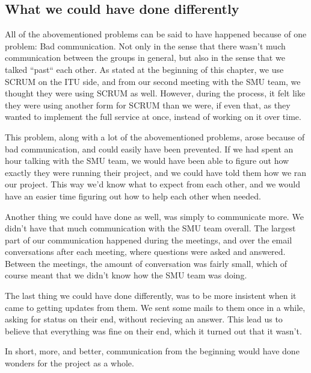 \subsection{What we could have done differently}
\label{Collaboration_SMU_CouldHave}
All of the abovementioned problems can be said to have happened because of one problem: Bad communication. Not only in the sense that there wasn't much communication between the groups in general, but also in the sense that we talked ``past`` each other. As stated at the beginning of this chapter, we use SCRUM on the ITU side, and from our second meeting with the SMU team, we thought  they were using SCRUM as well. However, during the process, it felt like they were using another form for SCRUM than we were, if even that, as they wanted to implement the full service at once, instead of working on it over time. 

This problem, along with a lot of the abovementioned problems, arose because of bad communication, and could easily have been prevented. If we had spent an hour talking with the SMU team, we would have been able to figure out how exactly they were running their project, and we could have told them how we ran our project. This way we'd know what to expect from each other, and we would have an easier time figuring out how to help each other when needed.

Another thing we could have done as well, was simply to communicate more. We didn't have that much communication with the SMU team overall. The largest part of our communication happened during the meetings, and over the email conversations after each meeting, where questions were asked and answered. Between the meetings, the amount of conversation was fairly small, which of course meant that we didn't know how the SMU team was doing.

The last thing we could have done differently, was to be more insistent when it came to getting updates from them. We sent some mails to them once in a while, asking for status on their end, without recieving an answer. This lead us to believe that everything was fine on their end, which it turned out that it wasn't.	

In short, more, and better, communication from the beginning would have done wonders for the project as a whole.